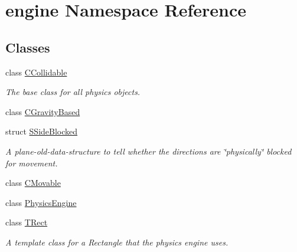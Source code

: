 \hypertarget{namespaceengine}{\section{engine Namespace Reference}
\label{namespaceengine}
}
\subsection*{Classes}
\begin{DoxyCompactItemize}
\item 
class \hyperlink{classengine_1_1CCollidable}{C\-Collidable}
\begin{DoxyCompactList}\small\item\em The base class for all physics objects. \end{DoxyCompactList}\item 
class \hyperlink{classengine_1_1CGravityBased}{C\-Gravity\-Based}
\item 
struct \hyperlink{structengine_1_1SSideBlocked}{S\-Side\-Blocked}
\begin{DoxyCompactList}\small\item\em A plane-\/old-\/data-\/structure to tell whether the directions are \char`\"{}physically\char`\"{} blocked for movement. \end{DoxyCompactList}\item 
class \hyperlink{classengine_1_1CMovable}{C\-Movable}
\item 
class \hyperlink{classengine_1_1PhysicsEngine}{Physics\-Engine}
\item 
class \hyperlink{classengine_1_1TRect}{T\-Rect}
\begin{DoxyCompactList}\small\item\em A template class for a Rectangle that the physics engine uses. \end{DoxyCompactList}\end{DoxyCompactItemize}
